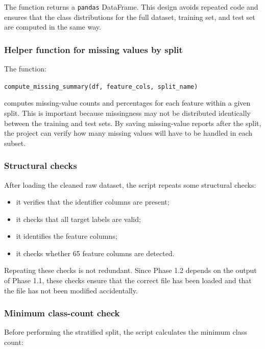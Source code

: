 \documentclass{ipgpmaster}
\begin{document}
The function returns a \texttt{pandas} DataFrame. This design avoids repeated code and ensures that the class distributions for the full dataset, training set, and test set are computed in the same way.

\subsubsection{Helper function for missing values by split}

The function:

\begin{center}
\texttt{compute\_missing\_summary(df, feature\_cols, split\_name)}
\end{center}

computes missing-value counts and percentages for each feature within a given split. This is important because missingness may not be distributed identically between the training and test sets. By saving missing-value reports after the split, the project can verify how many missing values will have to be handled in each subset.

\subsubsection{Structural checks}

After loading the cleaned raw dataset, the script repeats some structural checks:

\begin{itemize}
    \item it verifies that the identifier columns are present;
    \item it checks that all target labels are valid;
    \item it identifies the feature columns;
    \item it checks whether 65 feature columns are detected.
\end{itemize}

Repeating these checks is not redundant. Since Phase 1.2 depends on the output of Phase 1.1, these checks ensure that the correct file has been loaded and that the file has not been modified accidentally.

\subsubsection{Minimum class-count check}

Before performing the stratified split, the script calculates the minimum class count:
\end{document}

